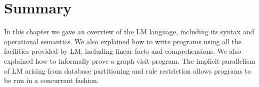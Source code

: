 \section{Summary}

In this chapter we gave an overview of the LM language, including its syntax and
operational semantics.  We also explained how to write programs using all the
facilities provided by LM, including linear facts and comprehensions. We also
explained how to informally prove a graph visit program.  The implicit
parallelism of LM arising from database partitioning and rule restriction allows
programs to be run in a concurrent fashion.
